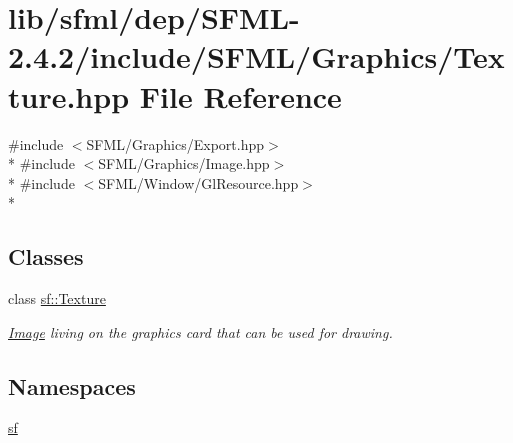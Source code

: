 \hypertarget{sfml_2dep_2_s_f_m_l-2_84_82_2include_2_s_f_m_l_2_graphics_2_texture_8hpp}{\section{lib/sfml/dep/\-S\-F\-M\-L-\/2.4.2/include/\-S\-F\-M\-L/\-Graphics/\-Texture.hpp File Reference}
\label{sfml_2dep_2_s_f_m_l-2_84_82_2include_2_s_f_m_l_2_graphics_2_texture_8hpp}
}
{\ttfamily \#include $<$S\-F\-M\-L/\-Graphics/\-Export.\-hpp$>$}\\*
{\ttfamily \#include $<$S\-F\-M\-L/\-Graphics/\-Image.\-hpp$>$}\\*
{\ttfamily \#include $<$S\-F\-M\-L/\-Window/\-Gl\-Resource.\-hpp$>$}\\*
\subsection*{Classes}
\begin{DoxyCompactItemize}
\item 
class \hyperlink{classsf_1_1_texture}{sf\-::\-Texture}
\begin{DoxyCompactList}\small\item\em \hyperlink{classsf_1_1_image}{Image} living on the graphics card that can be used for drawing. \end{DoxyCompactList}\end{DoxyCompactItemize}
\subsection*{Namespaces}
\begin{DoxyCompactItemize}
\item 
\hyperlink{namespacesf}{sf}
\end{DoxyCompactItemize}

